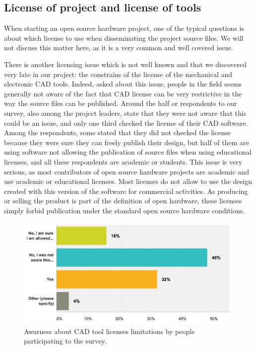 \documentclass[letterpaper, 10 pt, conference]{ieeeconf}  %
\begin{document}
\subsection{License of project and license of tools}

When starting an open source hardware project, one of the typical questions is about which license to use when disseminating the project source files. 
We will not discuss this matter here, as it is a very common and well covered issue. 

There is another licensing issue which is not well known and that we discovered very late in our project: the constrains of the license of the mechanical and electronic CAD tools. 
Indeed, asked about this issue, people in the field seems generally not aware of the fact that CAD license can be very restrictive in the way the source files can be published.
Around the half or respondents to our survey, also among the project leaders, state that they were not aware that this could be an issue, and only one third checked the license of their CAD software. 
Among the respondents, some stated that they did not checked the license because they were sure they can freely publish their design, but half of them are using software not allowing the publication of source files when using educational licenses, and all these respondents are academic or students.
This issue is very serious, as most contributors of open source hardware projects are academic and use academic or educational licenses. 
Most licenses do not allow to use the design created with this version of the software for commercial activities. 
As producing or selling the product is part of the definition of open hardware, these licenses simply forbid publication under the standard open source hardware conditions. 

\begin{figure}
\centering
\includegraphics[width=.9\columnwidth]{figures/aware-license}
\caption{Awarness about CAD tool licenses limitations by people participating to the survey.}
\label{fig:aware}
\end{figure}
\end{document}

